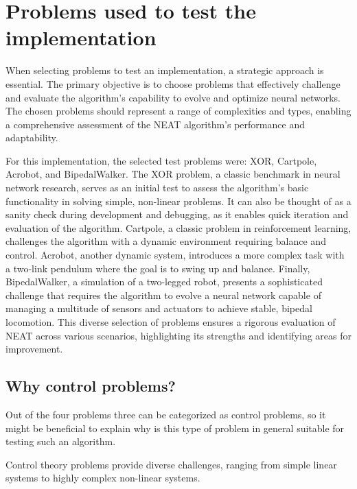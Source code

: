 \documentclass{article}
\begin{document}
    \section{Problems used to test the implementation}
    When selecting problems to test an implementation, a strategic approach is essential.
    The primary objective is to choose problems that effectively challenge and evaluate the algorithm's capability to evolve and optimize neural networks.
    The chosen problems should represent a range of complexities and types, enabling a comprehensive assessment of the NEAT
    algorithm's performance and adaptability.

    For this implementation, the selected test problems were: XOR, Cartpole, Acrobot, and BipedalWalker.
    The XOR problem, a classic benchmark in neural network research, serves as an initial
    test to assess the algorithm's basic functionality in solving simple, non-linear problems. It can also be thought
    of as a sanity check during development and debugging, as it enables quick iteration and evaluation of the algorithm.
    Cartpole, a classic problem in reinforcement learning, challenges the algorithm with a dynamic environment requiring balance and control.
    Acrobot, another dynamic system, introduces a more complex task with a two-link pendulum where the goal is to swing up and balance.
    Finally, BipedalWalker, a simulation of a two-legged robot, presents a sophisticated challenge that requires the algorithm to evolve a 
    neural network capable of managing a multitude of sensors and actuators to achieve stable, bipedal locomotion.
    This diverse selection of problems ensures a rigorous evaluation of NEAT across various scenarios,
    highlighting its strengths and identifying areas for improvement.

    \subsection{Why control problems?}
    Out of the four problems three can be categorized as control problems, so it might be beneficial to explain why is this type of problem in general
    suitable for testing such an algorithm. 

    Control theory problems provide diverse challenges, ranging from simple linear systems to highly
    complex non-linear systems.
\end{document}
